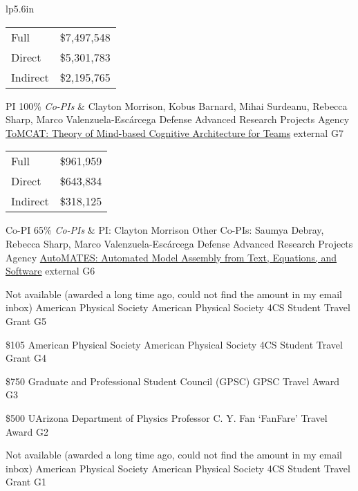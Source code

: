 \begin{ctabular}{lp{5.6in}}
  {
    \begin{tabular}[t]{lr}
        Full     & \$7,497,548\\
        Direct   & \$5,301,783\\
        Indirect & \$2,195,765
    \end{tabular}
}%
  {PI}%
  {100\%}%
  {\emph{Co-PIs} & Clayton Morrison, Kobus Barnard, Mihai Surdeanu, Rebecca Sharp, Marco Valenzuela-Esc{\'a}rcega}%
  {Defense Advanced Research Projects Agency}%
  {\href{https://ml4ai.github.io/tomcat}{ToMCAT: Theory of Mind-based Cognitive Architecture for Teams}}%
  {external}
  {\inrank{}G7}%

  {%
    \begin{tabular}[t]{lr}
        Full     & \$961,959\\
        Direct   & \$643,834\\
        Indirect & \$318,125
    \end{tabular}
  }
  {Co-PI}%
  {65\%}%
  {\emph{Co-PIs} &
        PI: Clayton Morrison\newline
        Other Co-PIs: Saumya Debray, Rebecca Sharp, Marco Valenzuela-Esc{\'a}rcega
  }%
  {Defense Advanced Research Projects Agency}%
  {\href{https://ml4ai.github.io/automates/}{AutoMATES: Automated Model Assembly from Text, Equations, and Software}}%
  {external}
  {G6}%

  {Not available (awarded a long time ago, could not find the amount in my email inbox)}%
  {American Physical Society}%
  {American Physical Society 4CS Student Travel Grant}%
  {G5}%

  {\$105}%
  {American Physical Society}%
  {American Physical Society 4CS Student Travel Grant}%
  {G4}%

  {\$750}%
  {Graduate and Professional Student Council (GPSC)}%
  {GPSC Travel Award}%
  {G3}%

  {\$500}%
  {UArizona Department of Physics}%
  {Professor C. Y. Fan `FanFare' Travel Award}%
  {G2}%

  {Not available (awarded a long time ago, could not find the amount in my email inbox)}%
  {American Physical Society}%
  {American Physical Society 4CS Student Travel Grant}%
  {G1}%

\end{ctabular}
